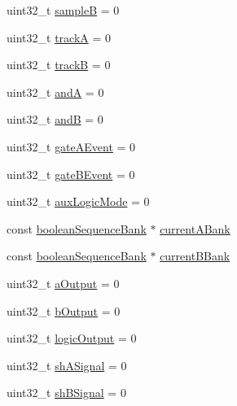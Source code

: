 \begin{DoxyCompactItemize}
\item 
uint32\+\_\+t \mbox{\hyperlink{class_dual_euclidean_ac7586dbe4b5473ad464f51ce8315c25e}{sampleB}} = 0
\item 
uint32\+\_\+t \mbox{\hyperlink{class_dual_euclidean_a9c9f254af7b89c373ce03d8b857b2477}{trackA}} = 0
\item 
uint32\+\_\+t \mbox{\hyperlink{class_dual_euclidean_a9c2333d598bf61280491b69b2e01e8e1}{trackB}} = 0
\item 
uint32\+\_\+t \mbox{\hyperlink{class_dual_euclidean_a37738201f93b6762ff5eef6e3f231f3b}{andA}} = 0
\item 
uint32\+\_\+t \mbox{\hyperlink{class_dual_euclidean_a7e2d80e82bb30ced0df37b75d21533ca}{andB}} = 0
\item 
uint32\+\_\+t \mbox{\hyperlink{class_dual_euclidean_a0ff6e722af5d341219112ed173fe2d6a}{gate\+A\+Event}} = 0
\item 
uint32\+\_\+t \mbox{\hyperlink{class_dual_euclidean_acf70f4efc7acca8111895c6a71f59bb5}{gate\+B\+Event}} = 0
\item 
uint32\+\_\+t \mbox{\hyperlink{class_dual_euclidean_ab28bd6271a4cc839b1419091f7a47e96}{aux\+Logic\+Mode}} = 0
\item 
const \mbox{\hyperlink{structboolean_sequence_bank}{boolean\+Sequence\+Bank}} $\ast$ \mbox{\hyperlink{class_dual_euclidean_a8c4259c3b82f62c4c3a2b5a7b2a511fb}{current\+A\+Bank}}
\item 
const \mbox{\hyperlink{structboolean_sequence_bank}{boolean\+Sequence\+Bank}} $\ast$ \mbox{\hyperlink{class_dual_euclidean_a72c4896af54012858903e8f3c33a2658}{current\+B\+Bank}}
\item 
uint32\+\_\+t \mbox{\hyperlink{class_dual_euclidean_ad814adf2f1fc533982bbd1f89eb0bee9}{a\+Output}} = 0
\item 
uint32\+\_\+t \mbox{\hyperlink{class_dual_euclidean_a97d63f45f6721a70490326a318c0445d}{b\+Output}} = 0
\item 
uint32\+\_\+t \mbox{\hyperlink{class_dual_euclidean_aa4a22dc6a09b16fd2e190b64ceeaa104}{logic\+Output}} = 0
\item 
uint32\+\_\+t \mbox{\hyperlink{class_dual_euclidean_aabf24d1670dc2701f468be10995683c9}{sh\+A\+Signal}} = 0
\item 
uint32\+\_\+t \mbox{\hyperlink{class_dual_euclidean_a9faf2d0a2cd274892651d0c35e5cbcf0}{sh\+B\+Signal}} = 0
\end{DoxyCompactItemize}
